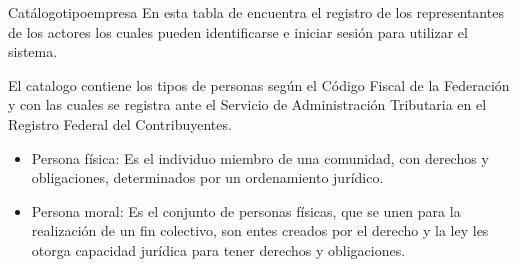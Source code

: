 \begin{BD}{Catálogo}{tipoempresa}{
	En esta tabla de encuentra el registro de los representantes de los actores  los cuales pueden identificarse e iniciar sesión para utilizar el sistema.
\bigskip
} %
		

		
		
\end{BD}

El catalogo contiene los tipos de personas según el Código Fiscal de la Federación  y con las cuales  se registra ante el Servicio de Administración Tributaria en el Registro Federal del Contribuyentes. \cite{CFF}  \cite{SATP}
\\
\begin{itemize}
    \item Persona física: Es el individuo miembro de una comunidad, con derechos y obligaciones, determinados por un ordenamiento jurídico.\cite{SATP}
    
    \item Persona moral: Es el conjunto de personas físicas, que se unen para la realización de un fin colectivo, son entes creados por el derecho y la ley les otorga capacidad jurídica para tener derechos y obligaciones.\cite{SATP}
\end{itemize}